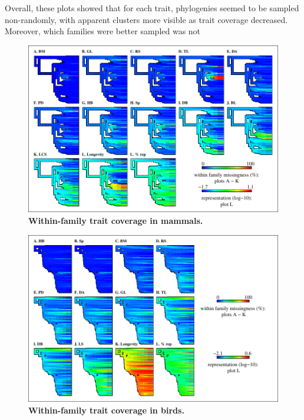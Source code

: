 Overall, these plots showed that for each trait, phylogenies seemed to be sampled non-randomly, with apparent clusters more visible as trait coverage decreased. Moreover, which families were better sampled was not 

\pagebreak

\begin{figure}[h!]
\centering
\includegraphics[scale=1]{figures/chapter2/NA_phylo_patterns/Mammals_coverage}
\caption[Within-family trait coverage in mammals]{\textbf{Within-family trait coverage in mammals.}}
\label{familycov_mammals}
\end{figure}

\begin{figure}[h!]
\centering
\includegraphics[scale=1]{figures/chapter2/NA_phylo_patterns/Birds_coverage}
\caption[Within-family trait coverage in birds]{\textbf{Within-family trait coverage in birds.}}
\label{familycov_birds}
\end{figure}


